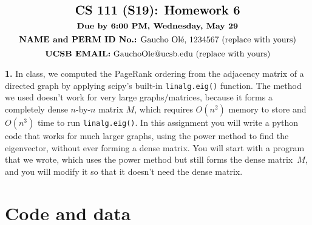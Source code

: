 \documentclass[11pt]{article}
\begin{document}
$$\mbox{\Large \textbf {CS 111 (S19): Homework 6}}$$
$$\mbox{\textbf {Due by 6:00 PM, Wednesday, May 29}}$$
$$\mbox{\textbf {NAME and PERM ID No.:} Gaucho Ol\'e, 1234567 (replace with yours)}$$
$$\mbox{\textbf {UCSB EMAIL:} GauchoOle@ucsb.edu (replace with yours)}$$

\par\bigskip
{\bf 1.}
In class, we computed the PageRank ordering from the adjacency matrix
of a directed graph by applying scipy's built-in {\tt linalg.eig()} function.  
The method we used doesn't work for very large graphs/matrices, because
it forms a completely dense $n$-by-$n$ matrix $M$, which requires $O(n^2)$ 
memory to store and $O(n^3)$ time to run {\tt linalg.eig()}.
In this assignment you will write a python code that works for much
larger graphs, using the power method to find the eigenvector, without
ever forming a dense matrix.
You will start with a program that we wrote, which uses the
power method but still forms the dense matrix~$M$, and you will
modify it so that it doesn't need the dense matrix.

\section{Code and data}
\end{document}
